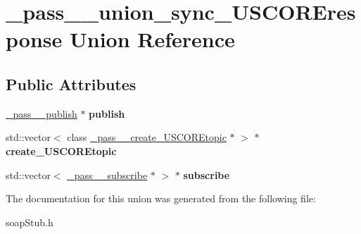 \hypertarget{union__pass____union__sync__USCOREresponse}{
\section{\_\-pass\_\-\_\-union\_\-sync\_\-USCOREresponse Union Reference}
\label{union__pass____union__sync__USCOREresponse}
}
\subsection*{Public Attributes}
\begin{DoxyCompactItemize}
\item 
\hypertarget{union__pass____union__sync__USCOREresponse_a6f2c6f3aadbfbfc8f47dcc568bae37bb}{
\hyperlink{class__pass____publish}{\_\-pass\_\-\_\-publish} $\ast$ {\bfseries publish}}
\label{union__pass____union__sync__USCOREresponse_a6f2c6f3aadbfbfc8f47dcc568bae37bb}

\item 
\hypertarget{union__pass____union__sync__USCOREresponse_a4c6a941bb686a640e081ae08d5cf3983}{
std::vector$<$ class \hyperlink{class__pass____create__USCOREtopic}{\_\-pass\_\-\_\-create\_\-USCOREtopic} $\ast$ $>$ $\ast$ {\bfseries create\_\-USCOREtopic}}
\label{union__pass____union__sync__USCOREresponse_a4c6a941bb686a640e081ae08d5cf3983}

\item 
\hypertarget{union__pass____union__sync__USCOREresponse_a5fa7d687f31a69dd33f5bb50f83d9b52}{
std::vector$<$ \hyperlink{class__pass____subscribe}{\_\-pass\_\-\_\-subscribe} $\ast$ $>$ $\ast$ {\bfseries subscribe}}
\label{union__pass____union__sync__USCOREresponse_a5fa7d687f31a69dd33f5bb50f83d9b52}

\end{DoxyCompactItemize}


The documentation for this union was generated from the following file:\begin{DoxyCompactItemize}
\item 
soapStub.h\end{DoxyCompactItemize}
